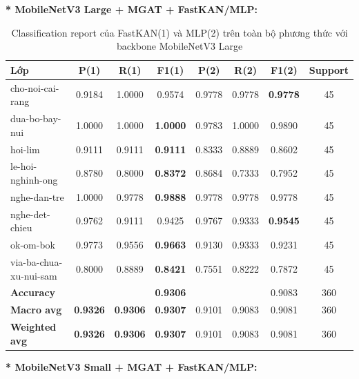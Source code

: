 \textbf{* MobileNetV3 Large + MGAT + FastKAN/MLP:}
\begin{table}[H]
\centering
\renewcommand{\arraystretch}{1.08}
\caption{\centering Classification report của FastKAN(1) và MLP(2) trên toàn bộ phương thức với backbone MobileNetV3 Large}
\label{tab:CRMobileNetV3LargeMGATFastKANMLP}
\begin{tabular}{lccccccc}
\hline
\textbf{Lớp} &
\textbf{P(1)} & \textbf{R(1)} & \textbf{F1(1)} &
\textbf{P(2)} & \textbf{R(2)} & \textbf{F1(2)} &
\textbf{Support} \\
\hline
cho-noi-cai-rang
& 0.9184 & 1.0000 & 0.9574
& 0.9778 & 0.9778 & \textbf{0.9778} & 45 \\

dua-bo-bay-nui
& 1.0000 & 1.0000 & \textbf{1.0000}
& 0.9783 & 1.0000 & 0.9890 & 45 \\

hoi-lim
& 0.9111 & 0.9111 & \textbf{0.9111}
& 0.8333 & 0.8889 & 0.8602 & 45 \\

le-hoi-nghinh-ong
& 0.8780 & 0.8000 & \textbf{0.8372}
& 0.8684 & 0.7333 & 0.7952 & 45 \\

nghe-dan-tre
& 1.0000 & 0.9778 & \textbf{0.9888}
& 0.9778 & 0.9778 & 0.9778 & 45 \\

nghe-det-chieu
& 0.9762 & 0.9111 & 0.9425
& 0.9767 & 0.9333 & \textbf{0.9545} & 45 \\

ok-om-bok
& 0.9773 & 0.9556 & \textbf{0.9663}
& 0.9130 & 0.9333 & 0.9231 & 45 \\

via-ba-chua-xu-nui-sam
& 0.8000 & 0.8889 & \textbf{0.8421}
& 0.7551 & 0.8222 & 0.7872 & 45 \\
\hline

\textbf{Accuracy}
& & & {\textbf{0.9306}}
& & & {0.9083} & 360 \\

\textbf{Macro avg}
& \textbf{0.9326} & \textbf{0.9306} & \textbf{0.9307}
& 0.9101 & 0.9083 & 0.9081 & 360 \\

\textbf{Weighted avg}
& \textbf{0.9326} & \textbf{0.9306} & \textbf{0.9307}
& 0.9101 & 0.9083 & 0.9081 & 360 \\
\hline
\end{tabular}
\end{table}
\textbf{* MobileNetV3 Small + MGAT + FastKAN/MLP:}
